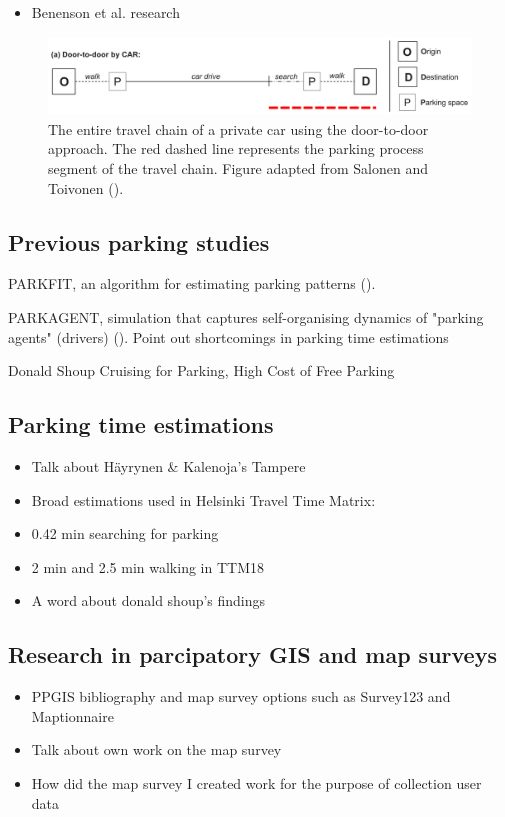 \begin{itemize}
  \item Benenson et al. research
\end{itemize}

\begin{figure}[H]%
    \includegraphics[width=\textwidth]{images/door2door.png}
    \caption[Door-to-door approach]{The entire travel chain of a private car using the door-to-door approach. The red dashed line represents the parking process segment of the travel chain. Figure adapted from Salonen and Toivonen (\citeyear{Salonen2013}).}%
    \label{fig:door-to-door}%
\end{figure}

\newpage
\subsection{Previous parking studies}
\justify

PARKFIT, an algorithm for estimating parking patterns (\cite{Levy2015}).

PARKAGENT, simulation that captures self-organising dynamics of "parking agents" (drivers) (\cite{Benenson2008}). Point out shortcomings in parking time estimations

Donald Shoup Cruising for Parking, High Cost of Free Parking

\newpage
\subsection{Parking time estimations}
\justify

\begin{itemize}
  \item Talk about Häyrynen \& Kalenoja's Tampere
  \item Broad estimations used in Helsinki Travel Time Matrix:
  \item 0.42 min searching for parking
  \item 2 min and 2.5 min walking in TTM18
  \item A word about donald shoup's findings
\end{itemize}

\newpage
\subsection{Research in parcipatory GIS and map surveys}
\justify

\begin{itemize}
  \item PPGIS bibliography and map survey options such as Survey123 and Maptionnaire
  \item Talk about own work on the map survey
  \item How did the map survey I created work for the purpose of collection user data
\end{itemize}
